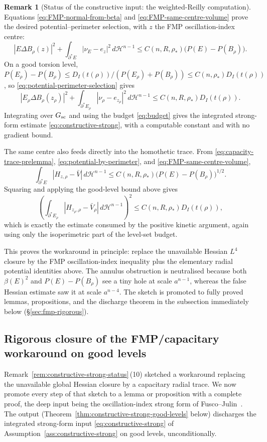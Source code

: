\documentclass[11pt]{amsart}
\theoremstyle{definition}
\newtheorem{remark}[theorem]{Remark}
\newcommand{\rstar}{\rho_*}
\newcommand{\Hn}{\mathcal H^{n-1}}
\begin{document}
\begin{remark}[Status of the constructive input: the weighted-Reilly computation]
Equations \eqref{eq:FMP-normal-from-beta} and \eqref{eq:FMP-same-centre-volume}
prove the desired potential--perimeter selection, with \(z\) the FMP
oscillation-index centre:
\begin{equation}\label{eq:potential-perimeter-selection}
   |E\Delta B_\rho(z)|^2+
   \int_{\partial^*E}|\nu_E-e_z|^2\,d\Hn
   \le C(n,R,\rstar)\bigl(P(E)-P(B_\rho)\bigr).
\end{equation}
On a good torsion level, \(P(E_\rho)-P(B_\rho)\le D_I(t(\rho))/(P(E_\rho)+P(B_\rho))\le C(n,\rstar)D_I(t(\rho))\), so
\eqref{eq:potential-perimeter-selection} gives
\[
   |E_\rho\Delta B_\rho(z_\rho)|^2+
   \int_{\partial^*E_\rho}|\nu_\rho-e_{z_\rho}|^2\,d\Hn
   \le C(n,R,\rstar)D_I(t(\rho)).
\]
Integrating over \(G_{\rm sc}\) and using the budget \eqref{eq:budget} gives the
integrated strong-form estimate \eqref{eq:constructive-strong}, with a
computable constant and with no gradient bound.

The same centre also feeds directly into the homothetic trace.  From
\eqref{eq:capacity-trace-prelemma}, \eqref{eq:potential-by-perimeter}, and
\eqref{eq:FMP-same-centre-volume},
\[
   \int_{\partial^*E}|H_{z,\rho}-\bar V|\,d\Hn
   \le C(n,R,\rstar)\bigl(P(E)-P(B_\rho)\bigr)^{1/2}.
\]
Squaring and applying the good-level bound above gives
\[
   \left(\int_{\partial^*E_\rho}|H_{z_\rho,\rho}-\bar V_\rho|\,d\Hn\right)^2
   \le C(n,R,\rstar)D_I(t(\rho)),
\]
which is exactly the estimate consumed by the positive kinetic argument, again
using only the isoperimetric part of the level-set budget.

This proves the workaround in principle: replace the unavailable Hessian
\(L^4\) closure by the FMP oscillation-index inequality plus the elementary
radial potential identities above.  The annulus obstruction is neutralised
because both \(\beta(E)^2\) and \(P(E)-P(B_\rho)\) see a tiny hole at scale
\(a^{n-1}\), whereas the false Hessian estimate saw it at scale \(a^{n-4}\).
The sketch is promoted to fully proved lemmas, propositions, and the
discharge theorem in the subsection immediately below
(\S\ref{sec:fmp-rigorous}).

\end{remark}

\subsection*{Rigorous closure of the FMP/capacitary workaround on good levels}
\label{sec:fmp-rigorous}

Remark~\ref{rem:constructive-strong-status}\,(10) sketched a workaround
replacing the unavailable global Hessian closure by a capacitary radial trace.
We now promote every step of that sketch to a lemma or proposition with a
complete proof, the deep input being the oscillation-index strong form of
Fusco--Julin~\cite{FJ2014}.  The output
(Theorem~\ref{thm:constructive-strong-good-levels} below) discharges the
integrated strong-form input \eqref{eq:constructive-strong} of
Assumption~\ref{ass:constructive-strong} on good levels, unconditionally.
\end{document}
